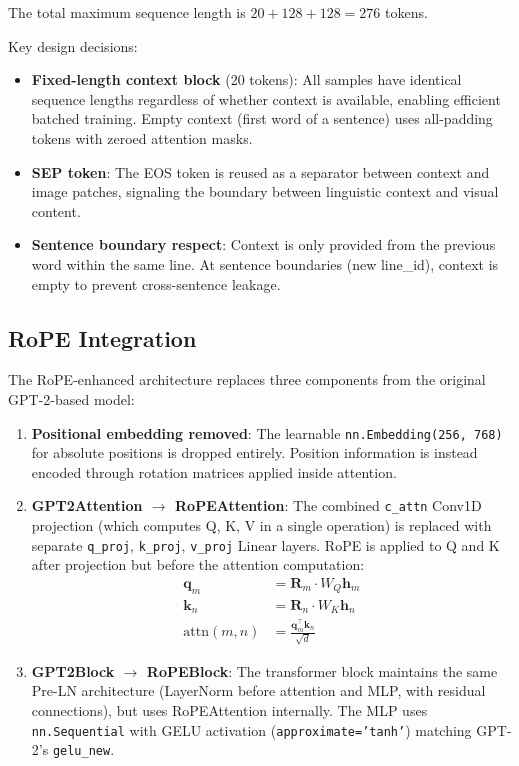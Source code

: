 \documentclass[11pt, a4paper]{article}
\begin{document}
The total maximum sequence length is $20 + 128 + 128 = 276$ tokens.

Key design decisions:
\begin{itemize}
    \item \textbf{Fixed-length context block} (20 tokens): All samples have identical sequence lengths regardless of whether context is available, enabling efficient batched training. Empty context (first word of a sentence) uses all-padding tokens with zeroed attention masks.
    \item \textbf{SEP token}: The EOS token is reused as a separator between context and image patches, signaling the boundary between linguistic context and visual content.
    \item \textbf{Sentence boundary respect}: Context is only provided from the previous word within the same line. At sentence boundaries (new line\_id), context is empty to prevent cross-sentence leakage.
\end{itemize}

\subsection{RoPE Integration}

The RoPE-enhanced architecture replaces three components from the original GPT-2-based model:

\begin{enumerate}
    \item \textbf{Positional embedding removed}: The learnable \texttt{nn.Embedding(256, 768)} for absolute positions is dropped entirely. Position information is instead encoded through rotation matrices applied inside attention.

    \item \textbf{GPT2Attention $\to$ RoPEAttention}: The combined \texttt{c\_attn} Conv1D projection (which computes Q, K, V in a single operation) is replaced with separate \texttt{q\_proj}, \texttt{k\_proj}, \texttt{v\_proj} Linear layers. RoPE is applied to Q and K after projection but before the attention computation:
    \begin{align}
        \mathbf{q}_m &= \mathbf{R}_m \cdot W_Q \mathbf{h}_m \\
        \mathbf{k}_n &= \mathbf{R}_n \cdot W_K \mathbf{h}_n \\
        \text{attn}(m, n) &= \frac{\mathbf{q}_m^\top \mathbf{k}_n}{\sqrt{d}}
    \end{align}

    \item \textbf{GPT2Block $\to$ RoPEBlock}: The transformer block maintains the same Pre-LN architecture (LayerNorm before attention and MLP, with residual connections), but uses RoPEAttention internally. The MLP uses \texttt{nn.Sequential} with GELU activation (\texttt{approximate='tanh'}) matching GPT-2's \texttt{gelu\_new}.
\end{enumerate}
\end{document}
